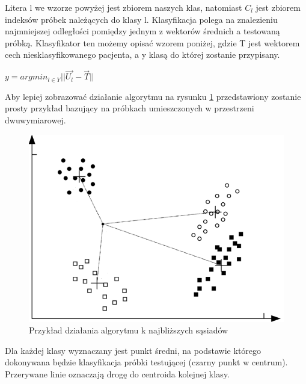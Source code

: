 \documentclass[12pt]{article}
\begin{document}
Litera l we wzorze powyżej jest zbiorem naszych klas, natomiast $ C_{l} $ jest zbiorem indeksów próbek należących do klasy l. Klasyfikacja polega na znalezieniu najmniejszej odległości pomiędzy jednym z wektorów średnich a testowaną próbką. Klasyfikator ten możemy opisać wzorem poniżej, gdzie T jest wektorem cech niesklasyfikowanego pacjenta, a y klasą do której zostanie przypisany. 
\begin{center}
$ y=argmin_{l\in{Y}}||\vec{U_{l}}-\vec{T}|| $ \cite{bib1}
\end{center}
\indent Aby lepiej zobrazować działanie algorytmu na rysunku \ref{algorytm_nm} przedstawiony zostanie prosty przykład bazujący na próbkach umieszczonych w przestrzeni dwuwymiarowej. \newline
\begin{figure}[H]
	\centering
		\includegraphics[scale=0.9]{images/nm_example.png}
	\caption{Przykład działania algorytmu k najbliższych sąsiadów \cite{bib2}}
	\label{algorytm_nm}
\end{figure}

 
\indent Dla każdej klasy wyznaczany jest punkt średni, na podstawie którego dokonywana będzie klasyfikacja próbki testującej (czarny punkt w centrum). Przerywane linie oznaczają drogę do centroida kolejnej klasy. 
\end{document}
